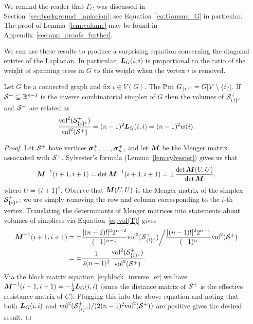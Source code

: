 We remind the reader that $\Gamma_G$ was discussed in  Section~\ref{sec:background_laplacian}; see  Equation~\eqref{eq:Gamma_G}  in particular. The proof of Lemma~\ref{lem:volume} may  be  found in Appendix~\ref{sec:app_proofs_further}.   


We can use these results to produce a surprising equation concerning  the diagonal entries of the Laplacian. In particular, $\vb*{L}_G(i,i)$ is proportional to the ratio of the weight of  spanning trees in $G$ to this weight when the vertex $i$ is removed. 

\begin{lemma}
	\label{lem:L(i,i)_trees}
	Let $G$ be a connected graph and fix $i\in V(G)$. 
	The Put $G_{\{i\}^c}=G[V\setminus \{i\}]$. If $\mathcal{S}^+\subseteq\mathbb{R}^{n-1}$  is the inverse combinatorial simplex of $G$ then the volumes
	of $\mathcal{S}^+_{\{i\}^c}$ and $\mathcal{S}^+$ are related as 
	\begin{equation}
	\label{eq:vol/vol}
	\frac{\textnormal{vol}^2(\mathcal{S}_{\{i\}^c}^+)}{\textnormal{vol}^2(\mathcal{S}^+)} = (n-1)^2\vb*{L}_G(i,i) = (n-1)^2w(i).
	\end{equation}
\end{lemma}
\begin{proof}
	Let $\mathcal{S}^+$ have vertices $\vb*{\sigma}_1^+,\dots,\vb*{\sigma}_n^+$, and let ${\vb*{M}}$ be the Menger matrix associated with $\mathcal{S}^+$. Sylvester's formula (Lemma~\ref{lem:sylvester}) gives us that 
	\begin{equation*}
	\M^{-1}(i+1,i+1) =\det\M^{-1}(i+1,i+1)= \pm \frac{\det\M(U,U)}{\det\M},
	\end{equation*}
	where $U=\{i+1\}^c$. Observe that ${\vb*{M}}(U,U)$ is the Menger matrix of the simplex $\mathcal{S}_{\{i\}^c}^+$; we are simply removing the row and column corresponding to the $i$-th vertex. Translating the determinants of Menger matrices into statements about volumes of simplices via Equation~\eqref{eq:vol(T)} gives 
	\begin{align*}
	{\vb*{M}}^{-1}(i+1,i+1) &= \pm \frac{[(n-2)!]^2 2^{n-2}}{(-1)^{n-1}}\textnormal{vol}^2(\mathcal{S}_{\{i\}^c}^+) \bigg / \frac{[(n-1)!]^2 2^{n-1}}{(-1)^n} \textnormal{vol}^2(\mathcal{S}^+) \\
	&= \mp \frac{1}{2(n-1)^2}\frac{\textnormal{vol}^2(\mathcal{S}_{\{i\}^c}^+)}{\textnormal{vol}^2(\mathcal{S}^+)}. 
	\end{align*} 
	Via the block matrix equation~\eqref{eq:block_inverse_er} we have ${\vb*{M}}^{-1}(i+1,i+1) = -\frac{1}{2}\vb*{L}_G(i,i)$ (since the distance matrix  of $\mathcal{S}^+$  is the effective resistance matrix of $G$). Plugging this into the above equation and noting that both $\vb*{L}_G(i,i)$ and $\textnormal{vol}^2(\mathcal{S}_{\{i\}^c}^+)/(2(n-1)^2\textnormal{vol}^2(\mathcal{S}^+))$ are positive  gives the desired result. 
\end{proof}


